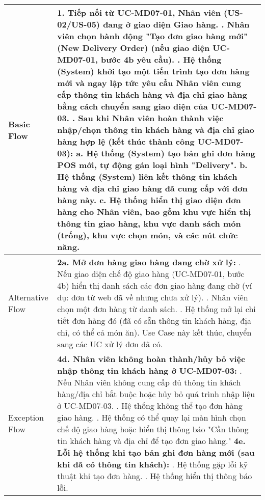 \begin{longtable}{|m{4cm}|p{11cm}|}
Basic Flow & 1. Tiếp nối từ UC-MD07-01, Nhân viên (US-02/US-05) đang ở giao diện Giao hàng. \newline 2. Nhân viên chọn hành động "Tạo đơn giao hàng mới" (New Delivery Order) (nếu giao diện UC-MD07-01, bước 4b yêu cầu). \newline 3. Hệ thống (System) khởi tạo một tiến trình tạo đơn hàng mới và ngay lập tức yêu cầu Nhân viên cung cấp thông tin khách hàng và địa chỉ giao hàng bằng cách chuyển sang giao diện của UC-MD07-03. \newline 4. Sau khi Nhân viên hoàn thành việc nhập/chọn thông tin khách hàng và địa chỉ giao hàng hợp lệ (kết thúc thành công UC-MD07-03): \newline    a. Hệ thống (System) tạo bản ghi đơn hàng POS mới, tự động gán loại hình "Delivery". \newline    b. Hệ thống (System) liên kết thông tin khách hàng và địa chỉ giao hàng đã cung cấp với đơn hàng này. \newline    c. Hệ thống hiển thị giao diện đơn hàng cho Nhân viên, bao gồm khu vực hiển thị thông tin giao hàng, khu vực danh sách món (trống), khu vực chọn món, và các nút chức năng. \\
\hline
Alternative Flow & \textbf{2a. Mở đơn hàng giao hàng đang chờ xử lý:} \newline    1. Nếu giao diện chế độ giao hàng (UC-MD07-01, bước 4b) hiển thị danh sách các đơn giao hàng đang chờ (ví dụ: đơn từ web đã về nhưng chưa xử lý). \newline    2. Nhân viên chọn một đơn hàng từ danh sách. \newline    3. Hệ thống mở lại chi tiết đơn hàng đó (đã có sẵn thông tin khách hàng, địa chỉ, có thể cả món ăn). Use Case này kết thúc, chuyển sang các UC xử lý đơn đã có. \\
\hline
Exception Flow & \textbf{4d. Nhân viên không hoàn thành/hủy bỏ việc nhập thông tin khách hàng ở UC-MD07-03:} \newline    1. Nếu Nhân viên không cung cấp đủ thông tin khách hàng/địa chỉ bắt buộc hoặc hủy bỏ quá trình nhập liệu ở UC-MD07-03. \newline    2. Hệ thống không thể tạo đơn hàng giao hàng. \newline    3. Hệ thống có thể quay lại màn hình chọn chế độ giao hàng hoặc hiển thị thông báo "Cần thông tin khách hàng và địa chỉ để tạo đơn giao hàng." \newline \textbf{4e. Lỗi hệ thống khi tạo bản ghi đơn hàng mới (sau khi đã có thông tin khách):} \newline    1. Hệ thống gặp lỗi kỹ thuật khi tạo đơn hàng. \newline    2. Hệ thống hiển thị thông báo lỗi. \\

\end{longtable}
